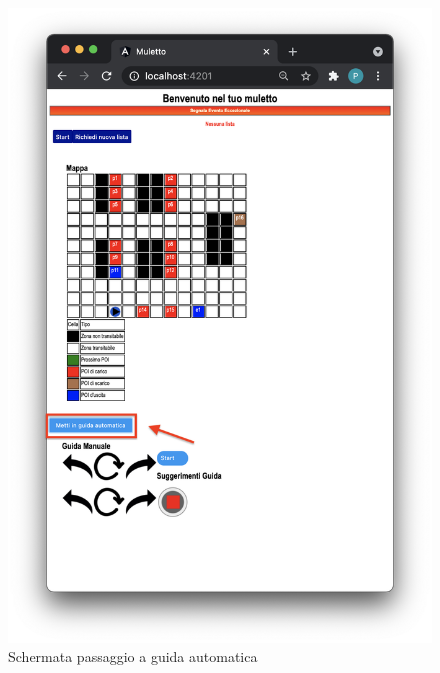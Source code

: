 \begin{figure}[H]
    \centering
    \includegraphics[scale=0.45]{res/images/forklift_cambioautomatica.png}
    \caption{Schermata passaggio a guida automatica}
\end{figure}
\pagebreak


